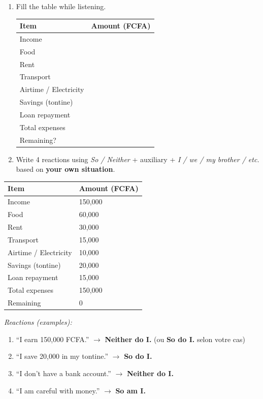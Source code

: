 \documentclass[11pt]{article}
\begin{document}
\begin{exercice}
\begin{enumerate}
\item Fill the table while listening.
\begin{center}
\begin{tabularx}{\linewidth}{|l|X|}\hline
\textbf{Item} & \textbf{Amount (FCFA)} \\ \hline
Income & \\ \hline
Food & \\ \hline
Rent & \\ \hline
Transport & \\ \hline
Airtime / Electricity & \\ \hline
Savings (tontine) & \\ \hline
Loan repayment & \\ \hline
Total expenses & \\ \hline
Remaining? & \\ \hline
\end{tabularx}
\end{center}
\item Write 4 reactions using \emph{So / Neither} + auxiliary + \emph{I / we / my brother / etc.} based on \textbf{your own situation}.
\end{enumerate}
\end{exercice}

\begin{corrige}
\begin{center}
\begin{tabularx}{\linewidth}{|l|X|}\hline
\textbf{Item} & \textbf{Amount (FCFA)} \\ \hline
Income & 150,000 \\ \hline
Food & 60,000 \\ \hline
Rent & 30,000 \\ \hline
Transport & 15,000 \\ \hline
Airtime / Electricity & 10,000 \\ \hline
Savings (tontine) & 20,000 \\ \hline
Loan repayment & 15,000 \\ \hline
Total expenses & 150,000 \\ \hline
Remaining & 0 \\ \hline
\end{tabularx}
\end{center}
\textit{Reactions (examples):}
\begin{enumerate}
\item ``I earn 150,000 FCFA.'' $\rightarrow$ \textbf{Neither do I.} (ou \textbf{So do I.} selon votre cas)
\item ``I save 20,000 in my tontine.'' $\rightarrow$ \textbf{So do I.}
\item ``I don't have a bank account.'' $\rightarrow$ \textbf{Neither do I.}
\item ``I am careful with money.'' $\rightarrow$ \textbf{So am I.}
\end{enumerate}
\end{corrige}
\end{document}
